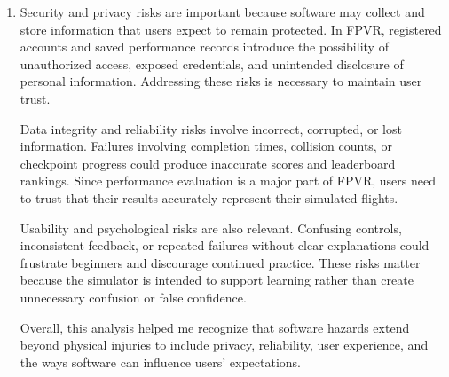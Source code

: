 \documentclass{article}
\begin{document}
\begin{enumerate}
    During the analysis, I began considering less obvious risks
    involving system reliability and the interpretation of
    simulator results. For example, incorrect checkpoint
    detection or crash recovery could produce misleading
    performance measurements. Similarly, inconsistent flight
    physics could create unrealistic expectations about
    physical drone operation.

    The addition of registered accounts and persistent
    performance records also introduced risks involving
    unauthorized access, data loss, and inaccurate leaderboard
    results. These risks became clearer as we examined the
    interactions between system components and considered
    how changes in project scope could introduce new hazards.


    \item %
    Security and privacy risks are important because software
    may collect and store information that users expect to
    remain protected. In FPVR, registered accounts and saved
    performance records introduce the possibility of unauthorized
    access, exposed credentials, and unintended disclosure
    of personal information. Addressing these risks is necessary
    to maintain user trust.

    Data integrity and reliability risks involve incorrect,
    corrupted, or lost information. Failures involving completion
    times, collision counts, or checkpoint progress could produce
    inaccurate scores and leaderboard rankings. Since performance
    evaluation is a major part of FPVR, users need to trust
    that their results accurately represent their simulated flights.

    Usability and psychological risks are also relevant.
    Confusing controls, inconsistent feedback, or repeated
    failures without clear explanations could frustrate
    beginners and discourage continued practice. These risks
    matter because the simulator is intended to support
    learning rather than create unnecessary confusion
    or false confidence.

    Overall, this analysis helped me recognize that software
    hazards extend beyond physical injuries to include
    privacy, reliability, user experience, and the ways
    software can influence users' expectations.

\end{enumerate}
\end{document}
